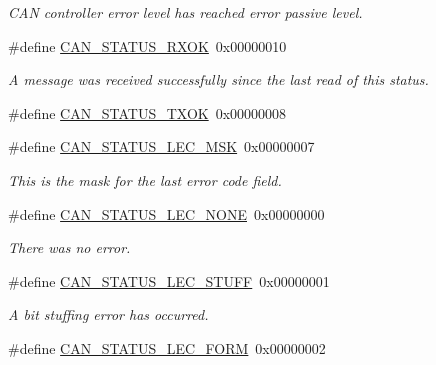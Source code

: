 \begin{DoxyCompactItemize}
\begin{DoxyCompactList}\small\item\em C\+AN controller error level has reached error passive level. \end{DoxyCompactList}\item 
\#define \hyperlink{group__can__api_ga780dfd5173c3ca51be021325fcb301e6}{C\+A\+N\+\_\+\+S\+T\+A\+T\+U\+S\+\_\+\+R\+X\+OK}~0x00000010\hypertarget{group__can__api_ga780dfd5173c3ca51be021325fcb301e6}{}\label{group__can__api_ga780dfd5173c3ca51be021325fcb301e6}

\begin{DoxyCompactList}\small\item\em A message was received successfully since the last read of this status. \end{DoxyCompactList}\item 
\#define \hyperlink{group__can__api_gae8a21b993556fac574a61c600c41d860}{C\+A\+N\+\_\+\+S\+T\+A\+T\+U\+S\+\_\+\+T\+X\+OK}~0x00000008
\item 
\#define \hyperlink{group__can__api_ga09d4f385b401cb9e226b9f52d0c7c8ef}{C\+A\+N\+\_\+\+S\+T\+A\+T\+U\+S\+\_\+\+L\+E\+C\+\_\+\+M\+SK}~0x00000007\hypertarget{group__can__api_ga09d4f385b401cb9e226b9f52d0c7c8ef}{}\label{group__can__api_ga09d4f385b401cb9e226b9f52d0c7c8ef}

\begin{DoxyCompactList}\small\item\em This is the mask for the last error code field. \end{DoxyCompactList}\item 
\#define \hyperlink{group__can__api_ga1b5513adc24698aa0e2c32d67d7c730f}{C\+A\+N\+\_\+\+S\+T\+A\+T\+U\+S\+\_\+\+L\+E\+C\+\_\+\+N\+O\+NE}~0x00000000\hypertarget{group__can__api_ga1b5513adc24698aa0e2c32d67d7c730f}{}\label{group__can__api_ga1b5513adc24698aa0e2c32d67d7c730f}

\begin{DoxyCompactList}\small\item\em There was no error. \end{DoxyCompactList}\item 
\#define \hyperlink{group__can__api_ga881c00803433a71131fcdae8bcd55fdc}{C\+A\+N\+\_\+\+S\+T\+A\+T\+U\+S\+\_\+\+L\+E\+C\+\_\+\+S\+T\+U\+FF}~0x00000001\hypertarget{group__can__api_ga881c00803433a71131fcdae8bcd55fdc}{}\label{group__can__api_ga881c00803433a71131fcdae8bcd55fdc}

\begin{DoxyCompactList}\small\item\em A bit stuffing error has occurred. \end{DoxyCompactList}\item 
\#define \hyperlink{group__can__api_ga09ffe0100093929da99dc790c0c1c155}{C\+A\+N\+\_\+\+S\+T\+A\+T\+U\+S\+\_\+\+L\+E\+C\+\_\+\+F\+O\+RM}~0x00000002\hypertarget{group__can__api_ga09ffe0100093929da99dc790c0c1c155}{}\label{group__can__api_ga09ffe0100093929da99dc790c0c1c155}


\end{DoxyCompactItemize}
